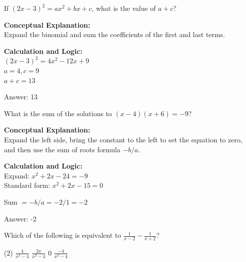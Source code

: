 \documentclass[11pt,paper=a4,answers]{exam}
\begin{document}
\begin{questions}
\vspace{40pt}

\question
If $(2x - 3)^2 = ax^2 + bx + c$, what is the value of $a + c$?

\begin{solution}
\textbf{Conceptual Explanation:} \\
Expand the binomial and sum the coefficients of the first and last terms.

\vspace{20pt}

\textbf{Calculation and Logic:} \\
$(2x - 3)^2 = 4x^2 - 12x + 9$ \\
$a = 4, c = 9$ \\
$a + c = 13$

\vspace{25pt}

Answer: \colorbox{yellow!100}{13}
\end{solution}

\vspace{40pt}

\question
What is the sum of the solutions to $(x - 4)(x + 6) = -9$?

\begin{solution}
\textbf{Conceptual Explanation:} \\
Expand the left side, bring the constant to the left to set the equation to zero, and then use the sum of roots formula $-b/a$.

\vspace{20pt}

\textbf{Calculation and Logic:} \\
Expand: $x^2 + 2x - 24 = -9$ \\
Standard form: $x^2 + 2x - 15 = 0$

\vspace{10pt}

Sum $= -b/a = -2/1 = -2$

\vspace{25pt}

Answer: \colorbox{yellow!100}{-2}
\end{solution}

\vspace{40pt}

\question
Which of the following is equivalent to $\frac{1}{x-2} - \frac{1}{x+2}$?
\begin{tasks}(2)
    \task $\frac{4}{x^2 - 4}$
    \task $\frac{2x}{x^2 - 4}$
    \task $0$
    \task $\frac{-4}{x^2 - 4}$
\end{tasks}


\end{questions}
\end{document}
